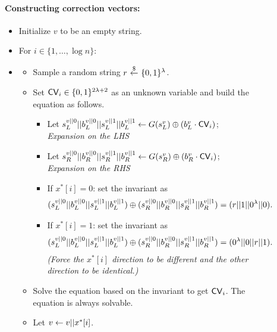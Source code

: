 \begin{figure}[p]
\begin{minipage}{\textwidth}
\begin{mdframed}
            \paragraph{Constructing correction vectors:}  
            \begin{itemize}[label={},leftmargin=*]
                \item Initialize $v$ to be an empty string.
                \item For $i\in \{1,\dots, \log n\}$: 
                \item 
                \begin{itemize}
                    \item Sample a random string $r~{\overset{\$}{\leftarrow}}~ \{0,1\}^{\lambda}$.
                    \item Set ${\sf CV}_i\in\{0,1\}^{2\lambda+2}$ as an unknown variable and build the equation as follows.
                    \begin{itemize}
                        \item Let $s^{v||0}_L || b^{v||0}_L || s^{v||1}_L || b^{v||1}_L\leftarrow G(s^v_L) \oplus (b^v_L \cdot {\sf CV}_i)$; \hfill \textit{Expansion on the LHS}
                        \item Let $s^{v||0}_R || b^{v||0}_R || s^{v||1}_R || b^{v||1}_R\leftarrow G(s^v_R) \oplus (b^v_R \cdot {\sf CV}_i)$; \hfill \textit{Expansion on the RHS}
                        \item If $x^*[i]=0$: set the invariant as 
                        \begin{align*}
                            (s^{v||0}_L || b^{v||0}_L || s^{v||1}_L || b^{v||1}_L) \oplus (s^{v||0}_R || b^{v||0}_R || s^{v||1}_R || b^{v||1}_R) = (r || 1 || 0^{\lambda} || 0).
                        \end{align*}
                        
                        \item If $x^*[i]=1$: set the invariant as 
                        \begin{align*}
                            (s^{v||0}_L || b^{v||0}_L || s^{v||1}_L || b^{v||1}_L) \oplus (s^{v||0}_R || b^{v||0}_R || s^{v||1}_R || b^{v||1}_R) = (0^{\lambda} || 0 || r || 1).
                        \end{align*}
                        \hfill \textit{(Force the $x^*[i]$ direction to be different and the other direction to be identical.)}
                    \end{itemize}
                    \item Solve the equation based on the invariant to get ${\sf CV}_i$. The equation is always solvable.
                    \item Let $v\leftarrow v||x^*[i]$.
                \end{itemize}  
            \end{itemize}

\end{mdframed}
\end{minipage}
\end{figure}
